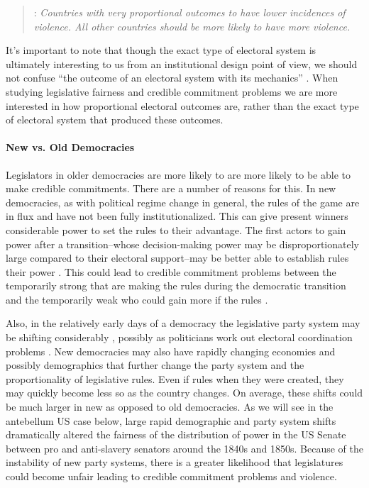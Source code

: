 \documentclass[a4paper]{article}\usepackage[]{graphicx}\usepackage[]{color}
\begin{document}
\begin{quote}
    : \emph{Countries with very proportional outcomes to have lower incidences of violence. All other countries should be more likely to have more violence.}
\end{quote}

It's important to note that though the exact type of electoral system is ultimately interesting to us from an institutional design point of view, we should not confuse ``the outcome of an electoral system with its mechanics'' \citep[][109]{Golder2005}. When studying legislative fairness and credible commitment problems we are more interested in how proportional electoral outcomes are, rather than the exact type of electoral system that produced these outcomes.

\paragraph{New vs. Old Democracies}

Legislators in older democracies are more likely to  are more likely to be able to make credible commitments. There are a number of reasons for this. In new democracies, as with political regime change in general, the rules of the game are in flux and have not been fully institutionalized. This can give present winners considerable power to set the rules to their advantage. The first actors to gain power after a transition--whose decision-making power may be disproportionately large compared to their electoral support--may be better able to establish  rules their power  \cite[108]{Saideman2002}. This could lead to credible commitment problems between the temporarily strong that are making the rules during the democratic transition and the temporarily weak who could gain more if the rules .

Also, in the relatively early days of a democracy the legislative party system may be shifting considerably \cite[161 for a review]{Mainwaring2007b}, possibly as politicians work out electoral coordination problems \citep{cox1997}. New democracies may also have rapidly changing economies and possibly demographics that further change the party system and the proportionality of legislative rules. Even if rules  when they were created, they may quickly become less so as the country changes. On average, these shifts could be much larger in new as opposed to old democracies. As we will see in the antebellum US case below, large rapid demographic and party system shifts dramatically altered the fairness of the distribution of power in the US Senate between pro and anti-slavery senators around the 1840s and 1850s. Because of the instability of new party systems, there is a greater likelihood that legislatures could become unfair leading to credible commitment problems and violence.
\end{document}
